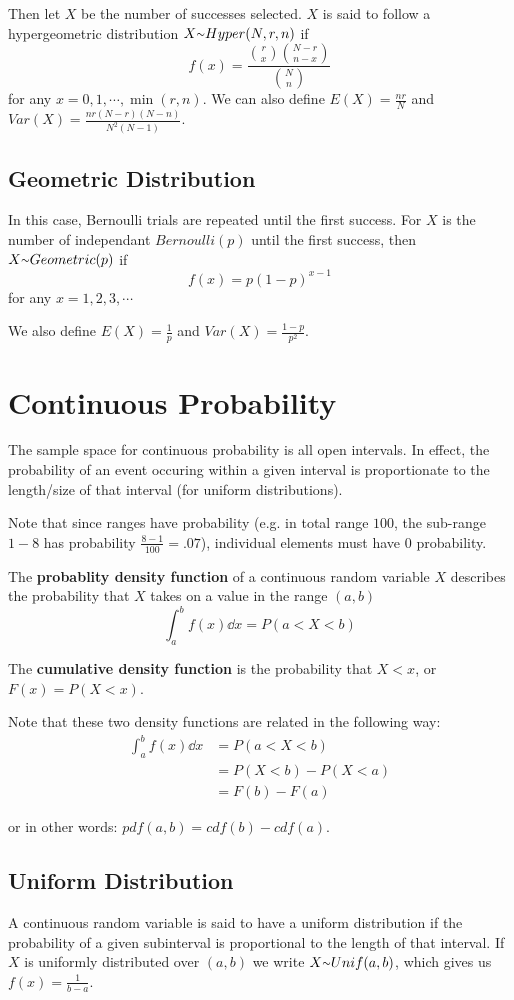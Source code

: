 \documentclass[12pt]{article}
\begin{document}
Then let $X$ be the number of successes selected. $X$ is said to follow a hypergeometric distribution $X \ttilde Hyper(N, r, n)$ if \[ f(x) = \frac{{r \choose x}{N-r \choose n-x}}{{N \choose n}} \] for any $x = 0, 1, \cdots, \min(r,n)$. We can also define $E(X) = \frac{nr}{N}$ and $Var(X) = \frac{nr(N - r)(N - n)}{N^2(N - 1)}$.

\subsection*{Geometric Distribution}
In this case, Bernoulli trials are repeated until the first success. For $X$ is the number of independant $Bernoulli(p)$ until the first success, then $X \ttilde Geometric(p)$ if \[ f(x) = p(1-p)^{x-1} \] for any $x = 1, 2, 3, \cdots$

We also define $E(X) = \frac{1}{p}$ and $Var(X) = \frac{1-p}{p^2}$.

\section*{Continuous Probability}
The sample space for continuous probability is all open intervals. In effect, the probability of an event occuring within a given interval is proportionate to the length/size of that interval (for uniform distributions).

Note that since ranges have probability (e.g. in total range $100$, the sub-range $1-8$ has probability $\frac{8-1}{100} = .07$), individual elements must have $0$ probability.

The {\bf probablity density function} of a continuous random variable $X$ describes the probability that $X$ takes on a value in the range $(a,b)$ \[\int_a^b f(x) \dd x = P(a < X < b) \]

The {\bf cumulative density function} is the probability that $X < x$, or $F(x) = P(X < x)$.

Note that these two density functions are related in the following way:
\begin{align*}
\int_a^b f(x) \dd x &= P(a < X < b)\\
                    &= P(X < b) - P(X < a)\\
                    &= F(b) - F(a)
\end{align*}

or in other words: $pdf(a,b) = cdf(b) - cdf(a)$.

\subsection*{Uniform Distribution}
A continuous random variable is said to have a uniform distribution if the probability of a given subinterval is proportional to the length of that interval. If $X$ is uniformly distributed over $(a,b)$ we write $X \ttilde Unif(a,b)$, which gives us $f(x) = \frac{1}{b-a}$.
\end{document}

